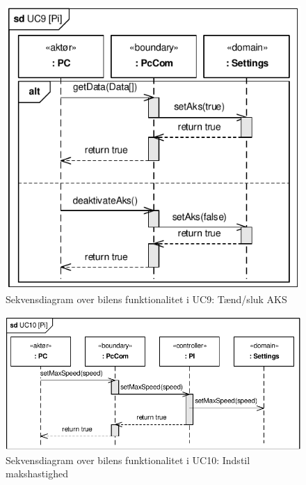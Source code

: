 \begin{figure}[h]
\centering
\includegraphics[]{../fig/diagrammer/bil/sd_uc9.pdf}
\caption{Sekvensdiagram over  bilens funktionalitet i UC9: Tænd/sluk AKS}
\label{fig:sd_uc9_bil}
\end{figure}

\begin{figure}[h]
\centering
\includegraphics[]{../fig/diagrammer/bil/sd_uc10.pdf}
\caption{Sekvensdiagram over  bilens funktionalitet i UC10: Indstil makshastighed}
\label{fig:sd_uc10_bil}
\end{figure}

